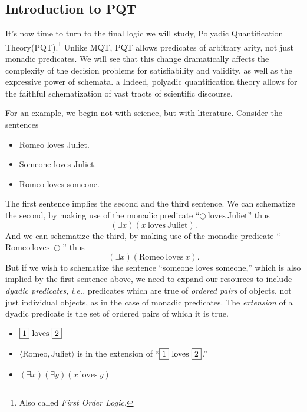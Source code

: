 \subsection{Introduction to PQT}
It's now time to turn to the final logic we will study, Polyadic Quantification Theory(PQT).\footnote{Also called \emph{First Order Logic}.} Unlike MQT, PQT allows predicates of arbitrary arity, not just monadic predicates. We will see that this change dramatically affects the complexity of the decision problems for satisfiability and validity, as well as the expressive power of schemata. a%
Indeed, polyadic quantification theory allows for the faithful schematization of vast tracts of scientific discourse. 

For an example, we begin not with science, but with literature.
Consider the sentences
\begin{itemize}
\item
Romeo loves Juliet.
\item
Someone loves Juliet.
\item
Romeo loves someone.
\end{itemize}
The first sentence implies the second and the third sentence.
We can schematize the second, by making use of the monadic predicate ``$\bigcirc\ \mathrm{loves\ Juliet}$'' thus
\[(\exists x)(x\ \mathrm{loves\ Juliet}).\]
And we can schematize the third, by making use of the monadic predicate ``$\mathrm{Romeo\ loves}\ \bigcirc$'' thus
\[(\exists x)(\mathrm{Romeo\ loves}\ x).\]
But if we wish to schematize the sentence ``someone loves someone,'' which is also implied by the first sentence above, we need to expand our resources to include \emph{dyadic predicates}, \emph{i.e.}, predicates which are true of \emph{ordered pairs} of objects, not just individual objects, as in the case of monadic predicates.
The \emph{extension} of a dyadic predicate is the set of ordered pairs of which it is true.
\begin{itemize}
\item
$\fbox{1}\ \mathrm{loves}\ \fbox{2}$
\item
$\langle \mathrm{Romeo,Juliet} \rangle$ is in the extension of 
``$\fbox{1}\ \mathrm{loves}\ \fbox{2}$.''
\item
$(\exists x)(\exists y)(x\ \mathrm{loves}\ y)$
\end{itemize}

